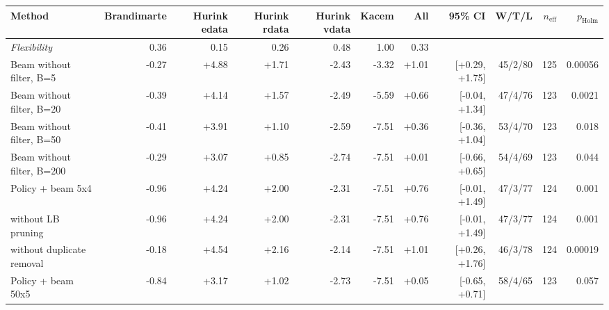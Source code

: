 \begin{tabular}{lrrrrrrrrrr}
\toprule
Method & Brandimarte & Hurink edata & Hurink rdata & Hurink vdata & Kacem & All & 95\% CI & W/T/L & $n_{\mathrm{eff}}$ & $p_{\mathrm{Holm}}$ \\
\midrule
\emph{Flexibility} & 0.36 & 0.15 & 0.26 & 0.48 & 1.00 & 0.33 & & & & \\
\midrule
Beam without filter, B=5 & -0.27 & +4.88 & +1.71 & -2.43 & -3.32 & +1.01 & [+0.29, +1.75] & 45/2/80 & 125 & 0.00056 \\
Beam without filter, B=20 & -0.39 & +4.14 & +1.57 & -2.49 & -5.59 & +0.66 & [-0.04, +1.34] & 47/4/76 & 123 & 0.0021 \\
Beam without filter, B=50 & -0.41 & +3.91 & +1.10 & -2.59 & -7.51 & +0.36 & [-0.36, +1.04] & 53/4/70 & 123 & 0.018 \\
Beam without filter, B=200 & -0.29 & +3.07 & +0.85 & -2.74 & -7.51 & +0.01 & [-0.66, +0.65] & 54/4/69 & 123 & 0.044 \\
Policy + beam 5x4 & -0.96 & +4.24 & +2.00 & -2.31 & -7.51 & +0.76 & [-0.01, +1.49] & 47/3/77 & 124 & 0.001 \\
  without LB pruning & -0.96 & +4.24 & +2.00 & -2.31 & -7.51 & +0.76 & [-0.01, +1.49] & 47/3/77 & 124 & 0.001 \\
  without duplicate removal & -0.18 & +4.54 & +2.16 & -2.14 & -7.51 & +1.01 & [+0.26, +1.76] & 46/3/78 & 124 & 0.00019 \\
Policy + beam 50x5 & -0.84 & +3.17 & +1.02 & -2.73 & -7.51 & +0.05 & [-0.65, +0.71] & 58/4/65 & 123 & 0.057 \\
\bottomrule
\end{tabular}

